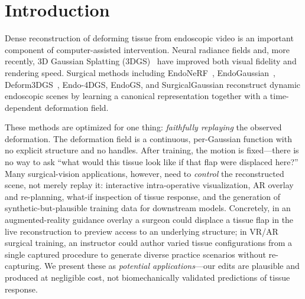 \documentclass[AMA,Times1COL]{WileyNJDv5} %
\begin{document}


\maketitle

\renewcommand\thefootnote{}

\renewcommand\thefootnote{\fnsymbol{footnote}}
\setcounter{footnote}{1}

\section{Introduction}\label{sec1}

Dense reconstruction of deforming tissue from endoscopic video is an important component of computer-assisted intervention. Neural radiance fields and, more recently, 3D Gaussian Splatting (3DGS)~\cite{kerbl2023gaussian} have improved both visual fidelity and rendering speed. Surgical methods including EndoNeRF~\cite{wang2022endonerf}, EndoGaussian~\cite{liu2024endogaussian}, Deform3DGS~\cite{yang2024deform3dgs}, Endo-4DGS, EndoGS, and SurgicalGaussian reconstruct dynamic endoscopic scenes by learning a canonical representation together with a time-dependent deformation field.

These methods are optimized for one thing: \emph{faithfully replaying} the observed deformation. The deformation field is a continuous, per-Gaussian function with no explicit structure and no handles. After training, the motion is fixed---there is no way to ask ``what would this tissue look like if that flap were displaced here?'' Many surgical-vision applications, however, need to \emph{control} the reconstructed scene, not merely replay it: interactive intra-operative visualization, AR overlay and re-planning, what-if inspection of tissue response, and the generation of synthetic-but-plausible training data for downstream models. Concretely, in an augmented-reality guidance overlay a surgeon could displace a tissue flap in the live reconstruction to preview access to an underlying structure; in VR/AR surgical training, an instructor could author varied tissue configurations from a single captured procedure to generate diverse practice scenarios without re-capturing. We present these as \emph{potential applications}---our edits are plausible and produced at negligible cost, not biomechanically validated predictions of tissue response.
\end{document}
